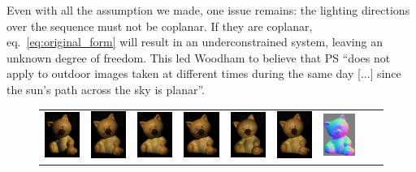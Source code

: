 \documentclass{report}
\begin{document}
Even with all the assumption we made, one issue remains: the lighting directions over the sequence must not be coplanar. If they are coplanar, eq.~\ref{eq:original_form} will result in an underconstrained system, leaving an unknown degree of freedom. This led Woodham to believe that PS ``does not apply to outdoor images taken at different times during the same day [...] since the sun's path across the sky is planar''.


\begin{figure}
\begin{tabular}{cccccc|ccc}
\includegraphics[width=.08\linewidth]{PS/cat_0.png} &
\includegraphics[width=.08\linewidth]{PS/cat_3.png} &
\includegraphics[width=.08\linewidth]{PS/cat_4.png} &
\includegraphics[width=.08\linewidth]{PS/cat_5.png} &
\includegraphics[width=.08\linewidth]{PS/cat_10.png} &
\includegraphics[width=.08\linewidth]{PS/cat_11.png} &
\includegraphics[width=.08\linewidth]{PS/cat_normal_map.png} &

\end{tabular}
\end{figure}
\end{document}
